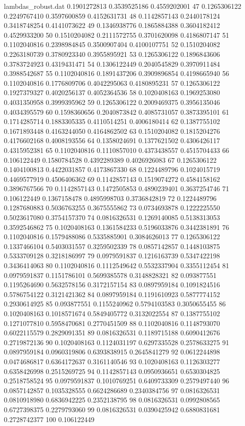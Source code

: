 \begin{filecontents*}{lambdas_robust.dat}
0.1901272813	0.3539525186	0.4559202001	47	0.1265306122
0.2249767410	0.3597600859	0.4152631731	48	0.1142857143
0.2440178124	0.3418748254	0.4141073622	49	0.1346938776
0.1865884388	0.3604182412	0.4529933200	50	0.1510204082
0.2111572755	0.3701620098	0.4186807147	51	0.1102040816
0.2398984845	0.3500907404	0.4100107751	52	0.1510204082
0.2263180739	0.3780923340	0.3955895921	53	0.1265306122
0.1896843606	0.3783724923	0.4319431471	54	0.1306122449
0.2040545829	0.3970911484	0.3988542687	55	0.1102040816
0.1891437206	0.3909896854	0.4198665940	56	0.1102040816
0.1776809706	0.4042295063	0.4180895231	57	0.1265306122
0.1927379327	0.4020256137	0.4052364536	58	0.1020408163
0.1969253080	0.4031350958	0.3999395962	59	0.1265306122
0.2009469375	0.3956135046	0.4034395579	60	0.1598360656
0.2040873842	0.4085731057	0.3873395101	61	0.1714285714
0.1883305335	0.4110514251	0.4006180414	62	0.1387755102
0.1671893448	0.4163244050	0.4164862502	63	0.1510204082
0.1815204276	0.4176602168	0.4008193556	64	0.1358024691
0.1377621502	0.4306426117	0.4315952381	65	0.1102040816
0.1110857010	0.4373438557	0.4515704433	66	0.106122449
0.1580784528	0.4392289389	0.4026926083	67	0.1265306122
0.1404100813	0.4422031857	0.4173867330	68	0.1224489796
0.1024015719	0.4469577919	0.4506406362	69	0.1142857143
0.1519074272	0.4584158162	0.3896767566	70	0.1142857143
0.1472505853	0.4890239401	0.3637254746	71	0.106122449
0.1367158478	0.4895998703	0.3736842819	72	0.1224489796
0.1287680883	0.5036763255	0.3675555862	73	0.0734693878
0.1222225550	0.5023617080	0.3754157370	74	0.0816326531
0.1269140085	0.5138313053	0.3592546862	75	0.1020408163
0.1361584233	0.5196033876	0.3442381891	76	0.1102040816
0.1579488086	0.5335885901	0.3084626013	77	0.1265306122
0.1337466104	0.5403031557	0.3259502339	78	0.0857142857
0.1448103875	0.5333709128	0.3218186997	79	0.0979591837
0.1216163739	0.5347422198	0.3436414063	80	0.1102040816
0.1112549642	0.5532337904	0.3355112454	81	0.0979591837
0.1151786101	0.5699385578	0.3148828321	82	0.093877551
0.1195264690	0.5632578156	0.3172157154	83	0.0897959184
0.1091824516	0.5786754122	0.3121421362	84	0.0897959184
0.1191610923	0.5877774152	0.2930614925	85	0.093877551
0.1155240962	0.5794103583	0.3050655455	86	0.1020408163
0.1018571674	0.5849405772	0.3132022554	87	0.1387755102
0.1271077810	0.5958470681	0.2770451509	88	0.1102040816
0.1148793070	0.6022115579	0.2829091351	89	0.0816326531
0.1189715188	0.6090412676	0.2719872136	90	0.1020408163
0.1124031197	0.6297335528	0.2578633275	91	0.0897959184
0.0960319806	0.6393838915	0.2645841279	92	0.0612244898
0.0474686817	0.6364172637	0.3161140546	93	0.1020408163
0.1126303277	0.6358426998	0.2515269725	94	0.1142857143
0.0950936651	0.6530304825	0.2518758524	95	0.0979591837
0.1010769251	0.6409733309	0.2579497440	96	0.0857142857
0.1035328555	0.6624286689	0.2340384756	97	0.0816326531
0.0810918980	0.6836942225	0.2352138795	98	0.0816326531
0.0992808565	0.6727398375	0.2279793060	99	0.0816326531
0.0390425942	0.6880831681	0.2728742377	100	0.106122449
\end{filecontents*}

